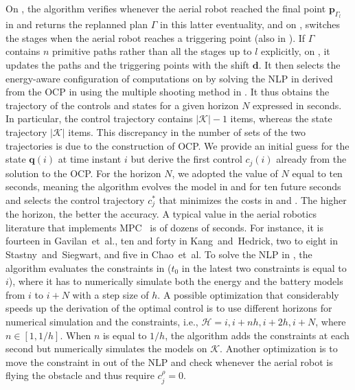 On  , the algorithm verifies whenever the aerial robot reached the final point $\mathbf{p}_{\Gamma_l}$ in  and returns the replanned plan $\Gamma$ in this latter eventuality, and on , switches the stages when the aerial robot reaches a triggering point (also in ). If $\Gamma$ contains $n$ primitive paths rather than all the stages up to $l$ explicitly, on , it updates the paths and the triggering points with the shift $\mathbf{d}$. It then selects the energy-aware configuration of computations on  by solving the NLP in  derived from the OCP in  using the multiple shooting method in . It thus obtains the trajectory of the controls and states for a given horizon $N$ expressed in seconds. In particular, the control trajectory contains $|\mathcal{K}|-1$ items, whereas the state trajectory $|\mathcal{K}|$ items. This discrepancy in the number of sets of the two trajectories is due to the construction of OCP. We provide an initial guess for the state $\mathbf{q}(i)$ at time instant $i$ but derive the first control $c_j(i)$ already from the solution to the OCP. For the horizon $N$, we adopted the value of $N$ equal to ten seconds, meaning the algorithm evolves the model in  and  for ten future seconds and selects the control trajectory $c_j^*$ that minimizes the costs in  and . The higher the horizon, the better the accuracy. A typical value in the aerial robotics literature that implements MPC~\citep{gavilan2015iterative,kang2009linear,stastny2018nonlinear,chao2011collision} is of dozens of seconds. For instance, it is fourteen in Gavilan~et~al., ten and forty in Kang~and~Hedrick, two to eight in Stastny~and~Siegwart, and five in Chao~et~al.
To solve the NLP in , the algorithm evaluates the constraints in  ($t_0$ in the latest two constraints is equal to $i$), where it has to numerically simulate both the energy and the battery models from $i$ to $i+N$ with a step size of $h$. A possible optimization that considerably speeds up the derivation of the optimal control is to use different horizons for numerical simulation and the constraints, i.e., $\mathcal{H}={i,i+nh,i+2h,i+N}$, where $n\in[1,1/h]$. When $n$ is equal to $1/h$, the algorithm adds the constraints at each second but numerically simulates the models on $\mathcal{K}$. Another optimization is to move the constraint in  out of the NLP and check whenever the aerial robot is flying the obstacle and thus require $c_j^\rho={0}$.

